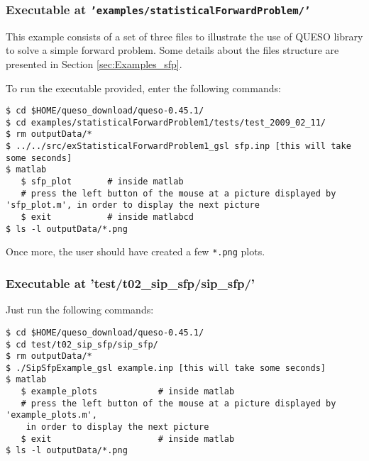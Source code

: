 \subsubsection{Executable at \texttt{'examples/statisticalForwardProblem/'}}

This example consists of a set of three files to illustrate the use of QUESO library to solve a simple forward problem. Some details about the files structure are presented in Section \ref{sec:Examples_sfp}.

To run the executable provided, enter the following commands:
\begin{lstlisting}[label={},caption={}]
$ cd $HOME/queso_download/queso-0.45.1/
$ cd examples/statisticalForwardProblem1/tests/test_2009_02_11/
$ rm outputData/*
$ ../../src/exStatisticalForwardProblem1_gsl sfp.inp [this will take some seconds]
$ matlab
   $ sfp_plot       # inside matlab
   # press the left button of the mouse at a picture displayed by 'sfp_plot.m', in order to display the next picture
   $ exit           # inside matlabcd
$ ls -l outputData/*.png
\end{lstlisting}

Once more, the user should have created a few \verb+*.png+ plots.




\subsubsection{Executable at 'test/t02\_sip\_sfp/sip\_sfp/'}\label{subsc-t02}


Just run the following commands:
\begin{verbatim}
$ cd $HOME/queso_download/queso-0.45.1/
$ cd test/t02_sip_sfp/sip_sfp/
$ rm outputData/*
$ ./SipSfpExample_gsl example.inp [this will take some seconds]
$ matlab
   $ example_plots            # inside matlab
   # press the left button of the mouse at a picture displayed by 'example_plots.m', 
    in order to display the next picture
   $ exit                     # inside matlab
$ ls -l outputData/*.png
\end{verbatim}


